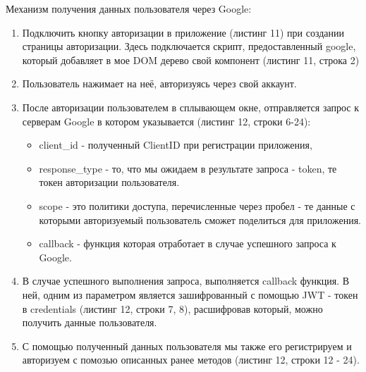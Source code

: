 \documentclass{disser}
\begin{document}
Механизм получения данных пользователя через Google:
\begin{enumerate}
        \item Подключить кнопку авторизации в приложение (листинг 11) при создании страницы авторизации. Здесь подключается скрипт, предоставленный google, который добавляет в мое DOM дерево свой компонент (листинг 11, строка 2)
    \item Пользователь нажимает на неё, авторизуясь через свой аккаунт.
    \item После авторизации пользователем в сплывающем окне, отправляется запрос к серверам Google в котором указывается (листинг 12, строки 6-24):
    \begin{itemize}
        \item client\_id - полученный ClientID при регистрации приложения,
        \item response\_type - то, что мы ожидаем в результате запроса - token, те токен авторизации пользователя. 
        \item scope - это политики доступа, перечисленные через пробел - те данные с которыми авторизуемый пользователь сможет поделиться для приложения.
        \item callback - функция которая отработает в случае успешного запроса к Google.
    \end{itemize}
    \item В случае успешного выполнения запроса, выполняется callback функция. В ней, одним из параметром является зашифрованный с помощью JWT - токен в credentials (листинг 12, строки 7, 8), расшифровав который, можно получить данные пользователя.
    \item С помощью полученный данных пользователя мы также его регистрируем и авторизуем с помозью описанных ранее методов (листинг 12, строки 12 - 24).
        
\end{enumerate}
\end{document}
